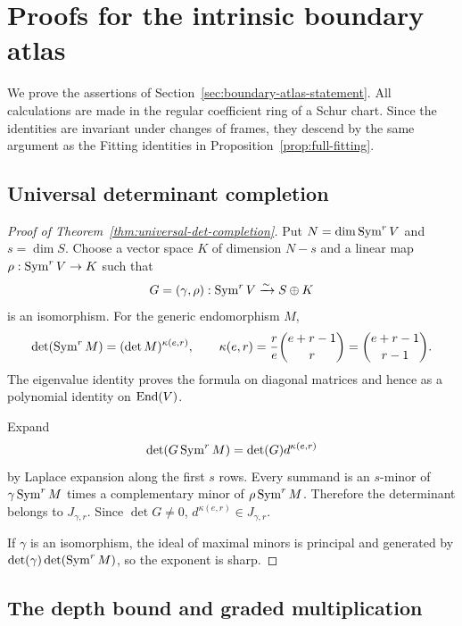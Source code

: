 \section{Proofs for the intrinsic boundary atlas}
\label{sec:boundary-atlas-proofs}

We prove the assertions of
Section~\ref{sec:boundary-atlas-statement}.  All calculations are made
in the regular coefficient ring of a Schur chart.  Since the
identities are invariant under changes of frames, they descend by the
same argument as the Fitting identities in
Proposition~\ref{prop:full-fitting}.

\subsection{Universal determinant completion}

\begin{proof}[Proof of Theorem~\ref{thm:universal-det-completion}]
Put \(N=\dim\operatorname{Sym}^rV\) and \(s=\dim S\).  Choose a vector
space \(K\) of dimension \(N-s\) and a linear map
\(\rho:\operatorname{Sym}^rV\to K\) such that
\[
 G=(\gamma,\rho):\operatorname{Sym}^rV\xrightarrow{\sim}S\oplus K
\]
is an isomorphism.  For the generic endomorphism \(M\),
\[
 \det(\operatorname{Sym}^rM)=(\det M)^{\kappa(e,r)},\qquad
 \kappa(e,r)=\frac r e\binom{e+r-1}{r}
              =\binom{e+r-1}{r-1}.
\]
The eigenvalue identity proves the formula on diagonal matrices and
hence as a polynomial identity on \(\operatorname{End}(V)\).

Expand
\[
 \det(G\operatorname{Sym}^rM)=\det(G)d^{\kappa(e,r)}
\]
by Laplace expansion along the first \(s\) rows.  Every summand is
an \(s\)-minor of \(\gamma\operatorname{Sym}^rM\) times a complementary
minor of \(\rho\operatorname{Sym}^rM\).  Therefore the determinant belongs to
\(J_{\gamma,r}\).  Since \(\det G\ne0\),
\(d^{\kappa(e,r)}\in J_{\gamma,r}\).

If \(\gamma\) is an isomorphism, the ideal of maximal minors is
principal and generated by
\(\det(\gamma)\det(\operatorname{Sym}^rM)\), so the exponent is sharp.
\end{proof}

\subsection{The depth bound and graded multiplication}

